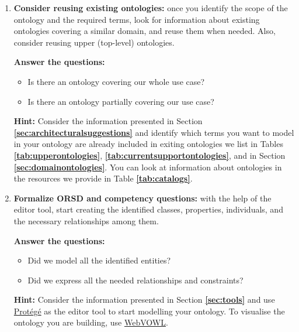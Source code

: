 \documentclass{guideline/sty/rapport}
\begin{document}
\begin{enumerate}
\item \textcolor{sapphire}{\textbf{Consider reusing existing ontologies:}} once you identify the scope of the ontology and the required terms, look for information about existing ontologies covering a similar domain, and reuse them when needed. Also, consider reusing upper (top-level) ontologies. \label{step6}

\textbf{Answer the questions:} 
\begin{itemize}
    \item Is there an ontology covering our whole use case? 
    \item Is there an ontology partially covering our use case? 
\end{itemize}

\begin{mdframed}[backgroundcolor=officegreen!8, linecolor=officegreen]
    \begin{minipage}[t]{1\linewidth}
    \textbf{Hint:}
      Consider the information presented in Section \textbf{\ref{sec:architecturalsuggestions}} and identify which terms you want to model in your ontology are already included in exiting ontologies we list in Tables \textbf{\ref{tab:upperontologies}}, \textbf{\ref{tab:currentsupportontologies}}, and in Section \textbf{\ref{sec:domainontologies}}. You can look at information about ontologies in the resources we provide in Table \textbf{\ref{tab:catalogs}}.
    \end{minipage}
\end{mdframed}

\item \textcolor{sapphire}{\textbf{Formalize \ac{ORSD} and competency questions:}} with the help of the editor tool, start creating the identified classes, properties, individuals, and the necessary relationships among them. \label{step7}

\textbf{Answer the questions:} 
\begin{itemize}
    \item Did we model all the identified entities? 
    \item Did we express all the needed relationships and constraints?
\end{itemize}

\begin{mdframed}[backgroundcolor=officegreen!8, linecolor=officegreen]
    \begin{minipage}[t]{1\linewidth}
    \textbf{Hint:}
      Consider the information presented in Section \textbf{\ref{sec:tools}} and use \href{https://protege.stanford.edu/products.php#desktop-protege}{Protégé} as the editor tool to start modelling your ontology.
      To visualise the ontology you are building, use \href{https://service.tib.eu/webvowl/}{WebVOWL}.
    \end{minipage}
\end{mdframed}



\end{enumerate}
\end{document}
